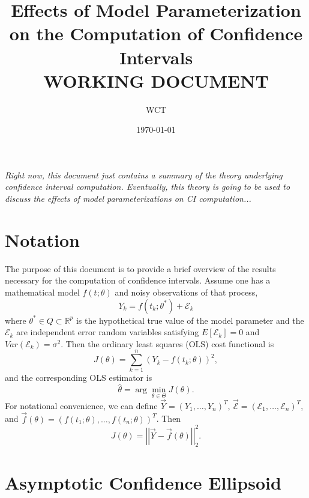 \documentclass[10pt]{article}
\author{WCT}
\date{\today}
\title{Effects of Model Parameterization on the Computation of Confidence Intervals\\
\large WORKING DOCUMENT}
\newcommand{\vecnorm}[1]{\left|\left|#1\right|\right|}
\begin{document}
\maketitle
\emph{Right now, this document just contains a summary of the theory underlying confidence interval computation.  Eventually, this theory is going to be used to discuss the effects of model parameterizations on CI computation...}\\

\vspace{0.3in}


\section{Notation}

The purpose of this document is to provide a brief overview of the results necessary for the computation of confidence intervals.  Assume one has a mathematical model $f(t;\theta)$ and noisy observations of that process,
\begin{equation*}
Y_{k} = f(t_{k};\theta^{*}) + \mathcal{E}_{k}
\end{equation*}
where $\theta^{*} \in Q \subset \mathbb{R}^{p}$ is the hypothetical true value of the model parameter and the $\mathcal{E}_{k}$ are independent error random variables satisfying $E[\mathcal{E}_{k}] = 0$ and $Var(\mathcal{E}_{k}) = \sigma^{2}$.  Then the ordinary least squares (OLS) cost functional is
\begin{equation*}
J(\theta) = \sum_{k=1}^{n} \left(Y_{k} - f(t_{k};\theta)\right)^{2},
\end{equation*}
and the corresponding OLS estimator is
\begin{equation*}
\hat{\theta} = \arg \min_{\theta\in \Theta} J(\theta).
\end{equation*}
For notational convenience, we can define $\vec{Y} = (Y_{1},\ldots,Y_{n})^{T}$, $\vec{\mathcal{E}} = (\mathcal{E}_{1},\ldots,\mathcal{E}_{n})^{T}$, and $\vec{f}(\theta) = (f(t_{1};\theta),\ldots,f(t_{n};\theta))^{T}$.  Then
\begin{equation}\label{eq:ols_cost_vec}
J(\theta) = \vecnorm{\vec{Y} - \vec{f}(\theta)}_{2}^{2}.
\end{equation}



\section{Asymptotic Confidence Ellipsoid}
\end{document}
